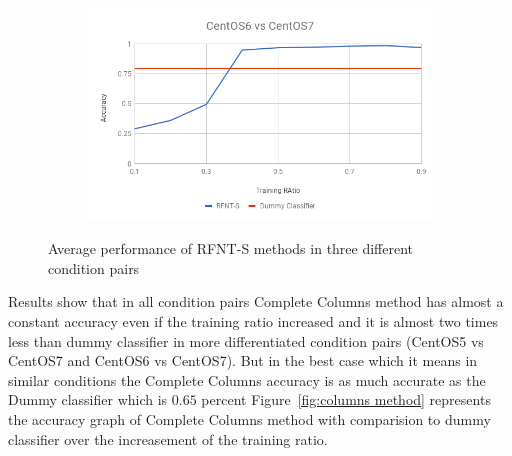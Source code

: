 \documentclass[10pt, conference, compsocconf]{IEEEtran}
\begin{document}
\begin{figure}[h!]
\begin{subfigure}[b]{0.8\linewidth}
                \includegraphics[width=\columnwidth]{figures/ALS/RFNT-S-ALS-6vs7-PFS}
        \end{subfigure}
        \caption{Average performance of RFNT-S methods in three different condition pairs}
        \label{fig:RFNT-S method}
\end{figure}
Results show that in all condition pairs Complete Columns method has 
almost a constant accuracy even if the training ratio increased and it 
is almost two times less than dummy classifier in more differentiated 
condition pairs (CentOS5 vs CentOS7 and CentOS6 vs CentOS7). But in the 
best case which it means in similar conditions the Complete Columns 
accuracy is as much accurate as the Dummy classifier which is $0.65$ 
percent Figure~\ref{fig:columns method} represents
the accuracy graph of Complete Columns method with comparision to dummy 
classifier over the increasement of the training ratio.\\
\end{document}
